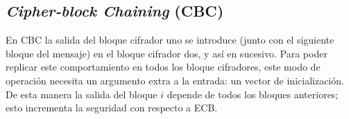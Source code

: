%
%

\subsection{\textit{Cipher-block Chaining} (CBC)}

En CBC la salida del bloque cifrador uno se introduce (junto con el siguiente
bloque del mensaje) en el bloque cifrador dos, y así en sucesivo. Para poder
replicar este comportamiento en todos los bloque cifradores, este modo de
operación necesita un argumento extra a la entrada: un vector de
inicialización. De esta manera la salida del bloque $ i $ depende de todos
los bloques anteriores; esto incrementa la seguridad con respecto a ECB.

\vspace{0.5cm}

